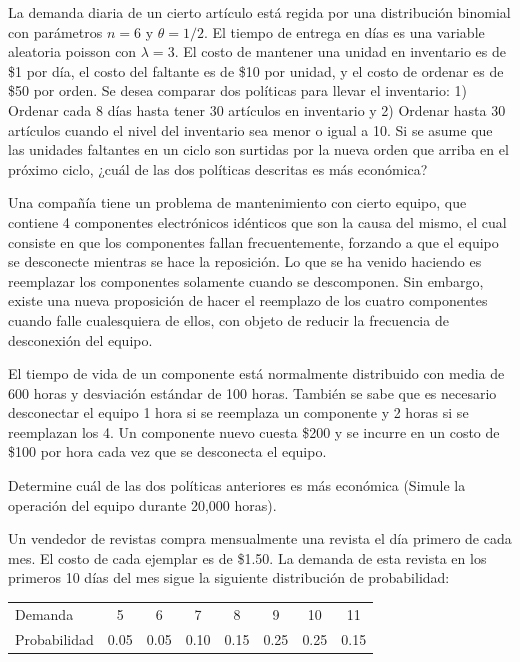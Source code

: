 \documentclass[11pt,letterpaper]{report}
\begin{document}
\begin{description}[leftmargin=1.2cm,style=nextline]
\item[5.5.] La demanda diaria de un cierto artículo está regida por una
distribución binomial con parámetros $n=6$ y $\theta=1/2$. El tiempo de
entrega en días es una variable aleatoria poisson con $\lambda=3$. El costo
de mantener una unidad en inventario es de \$1 por día, el costo del faltante
es de \$10 por unidad, y el costo de ordenar es de \$50 por orden. Se desea
comparar dos políticas para llevar el inventario: 1) Ordenar cada 8 días
hasta tener 30 artículos en inventario y 2) Ordenar hasta 30 artículos
cuando el nivel del inventario sea menor o igual a 10. Si se asume que las
unidades faltantes en un ciclo son surtidas por la nueva orden que arriba en
el próximo ciclo, ¿cuál de las dos políticas descritas es más económica?

\item[5.6.] Una compañía tiene un problema de mantenimiento con cierto
equipo, que contiene 4 componentes electrónicos idénticos que son la causa
del mismo, el cual consiste en que los componentes fallan frecuentemente,
forzando a que el equipo se desconecte mientras se hace la reposición. Lo
que se ha venido haciendo es reemplazar los componentes solamente cuando se
descomponen. Sin embargo, existe una nueva proposición de hacer el reemplazo
de los cuatro componentes cuando falle cualesquiera de ellos, con objeto de
reducir la frecuencia de desconexión del equipo.

El tiempo de vida de un componente está normalmente distribuido con media de
600 horas y desviación estándar de 100 horas. También se sabe que es
necesario desconectar el equipo 1 hora si se reemplaza un componente y 2
horas si se reemplazan los 4. Un componente nuevo cuesta \$200 y se incurre
en un costo de \$100 por hora cada vez que se desconecta el equipo.

Determine cuál de las dos políticas anteriores es más económica (Simule la
operación del equipo durante 20,000 horas).

\item[5.7.] Un vendedor de revistas compra mensualmente una revista el día
primero de cada mes. El costo de cada ejemplar es de \$1.50. La demanda de
esta revista en los primeros 10 días del mes sigue la siguiente distribución
de probabilidad:

\begin{center}
\begin{tabular}{lccccccc}
Demanda & 5 & 6 & 7 & 8 & 9 & 10 & 11 \\
Probabilidad & 0.05 & 0.05 & 0.10 & 0.15 & 0.25 & 0.25 & 0.15 \\
\end{tabular}
\end{center}


\end{description}
\end{document}
